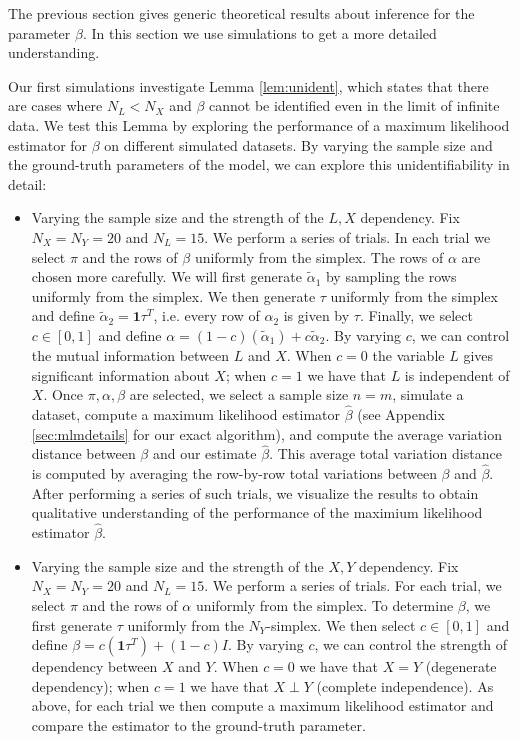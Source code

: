 \documentclass{article}
\theoremstyle{definition}
\begin{document}
The previous section gives generic theoretical results about inference for the parameter $\beta$.  In this section we use simulations to get a more detailed understanding.

Our first simulations investigate Lemma \ref{lem:unident}, which states that there are cases where $N_L<N_X$ and $\beta$ cannot be identified even in the limit of infinite data.  We test this Lemma by exploring the performance of a maximum likelihood estimator for $\beta$ on different simulated datasets.  By varying the sample size and the ground-truth parameters of the model, we can explore this unidentifiability in detail:

\begin{itemize}
    \item Varying the sample size and the strength of the $L,X$ dependency.  Fix $N_X=N_Y=20$ and $N_L=15$.  We perform a series of trials.  In each trial we select $\pi$ and the rows of $\beta$ uniformly from the simplex.  The rows of $\alpha$ are chosen more carefully.  We will first generate $\tilde \alpha_1$ by sampling the rows uniformly from the simplex.  We then generate $\tau$ uniformly from the simplex and define $\tilde \alpha_2 = \mathbf{1}\tau^T$, i.e. every row of $\alpha_2$ is given by $\tau$.  Finally, we select $c\in[0,1]$ and define $\alpha=(1-c)(\tilde \alpha_1)+c\tilde \alpha_2$.  By varying $c$, we can control the mutual information between $L$ and $X$.  When $c=0$ the variable $L$ gives significant information about $X$; when $c=1$ we have that $L$ is independent of $X$.  Once $\pi,\alpha,\beta$ are selected, we select a sample size $n=m$, simulate a dataset, compute a maximum likelihood estimator $\hat \beta $ (see Appendix \ref{sec:mlmdetails} for our exact algorithm), and compute the average variation distance between $\beta$ and our estimate $\hat \beta$.  This average total variation distance is computed by averaging the row-by-row total variations between $\beta$ and  $\hat \beta$.  After performing a series of such trials, we visualize the results to obtain qualitative understanding of the performance of the maximium likelihood estimator $\hat \beta$.

    \item Varying the sample size and the strength of the $X,Y$ dependency.  Fix $N_X=N_Y=20$ and $N_L=15$.  We perform a series of trials.  For each trial, we select $\pi$ and the rows of $\alpha$ uniformly from the simplex.  To determine $\beta$, we first generate $\tau$ uniformly from the $N_Y$-simplex.  We then select $c\in[0,1]$ and define $\beta=c(\mathbf{1}\tau^T)+(1-c)I$.  By varying $c$, we can control the strength of dependency between $X$ and $Y$.  When $c=0$ we have that $X=Y$ (degenerate dependency); when $c=1$ we have that $X\perp Y$ (complete independence).  As above, for each trial we then compute a maximum likelihood estimator and compare the estimator to the ground-truth parameter.   
\end{itemize}
\end{document}
